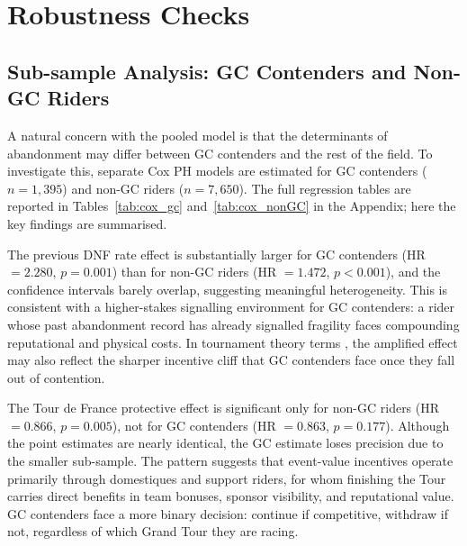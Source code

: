 \section{Robustness Checks}
\label{sec:robustness}

\subsection{Sub-sample Analysis: GC Contenders and Non-GC Riders}

A natural concern with the pooled model is that the determinants of abandonment may differ between GC contenders and the rest of the field. To investigate this, separate Cox PH models are estimated for GC contenders ($n = 1{,}395$) and non-GC riders ($n = 7{,}650$). The full regression tables are reported in Tables~\ref{tab:cox_gc} and~\ref{tab:cox_nonGC} in the Appendix; here the key findings are summarised.

The previous DNF rate effect is substantially larger for GC contenders (HR $= 2.280$, $p = 0.001$) than for non-GC riders (HR $= 1.472$, $p < 0.001$), and the confidence intervals barely overlap, suggesting meaningful heterogeneity. This is consistent with a higher-stakes signalling environment for GC contenders: a rider whose past abandonment record has already signalled fragility faces compounding reputational and physical costs. In tournament theory terms \parencite{rosen1981superstars, lazear1981rank}, the amplified effect may also reflect the sharper incentive cliff that GC contenders face once they fall out of contention.

The Tour de France protective effect is significant only for non-GC riders (HR $= 0.866$, $p = 0.005$), not for GC contenders (HR $= 0.863$, $p = 0.177$). Although the point estimates are nearly identical, the GC estimate loses precision due to the smaller sub-sample. The pattern suggests that event-value incentives operate primarily through domestiques and support riders, for whom finishing the Tour carries direct benefits in team bonuses, sponsor visibility, and reputational value. GC contenders face a more binary decision: continue if competitive, withdraw if not, regardless of which Grand Tour they are racing.

